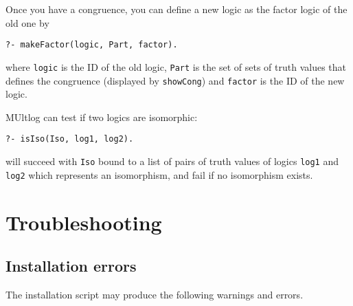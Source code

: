 \documentclass[
]{article}
\newcommand{\passthrough}[1]{#1}
\begin{document}
Once you have a congruence, you can define a new logic as the factor
logic of the old one by

\begin{lstlisting}
?- makeFactor(logic, Part, factor).
\end{lstlisting}

where \passthrough{\lstinline!logic!} is the ID of the old logic,
\passthrough{\lstinline!Part!} is the set of sets of truth values that
defines the congruence (displayed by \passthrough{\lstinline!showCong!})
and \passthrough{\lstinline!factor!} is the ID of the new logic.

MUltlog can test if two logics are isomorphic:

\begin{lstlisting}
?- isIso(Iso, log1, log2).
\end{lstlisting}

will succeed with \passthrough{\lstinline!Iso!} bound to a list of pairs
of truth values of logics \passthrough{\lstinline!log1!} and
\passthrough{\lstinline!log2!} which represents an isomorphism, and fail
if no isomorphism exists.

\hypertarget{troubleshooting}{%
\section{Troubleshooting}\label{troubleshooting}}

\hypertarget{installation-errors}{%
\subsection{Installation errors}\label{installation-errors}}

The installation script may produce the following warnings and errors.
\end{document}
